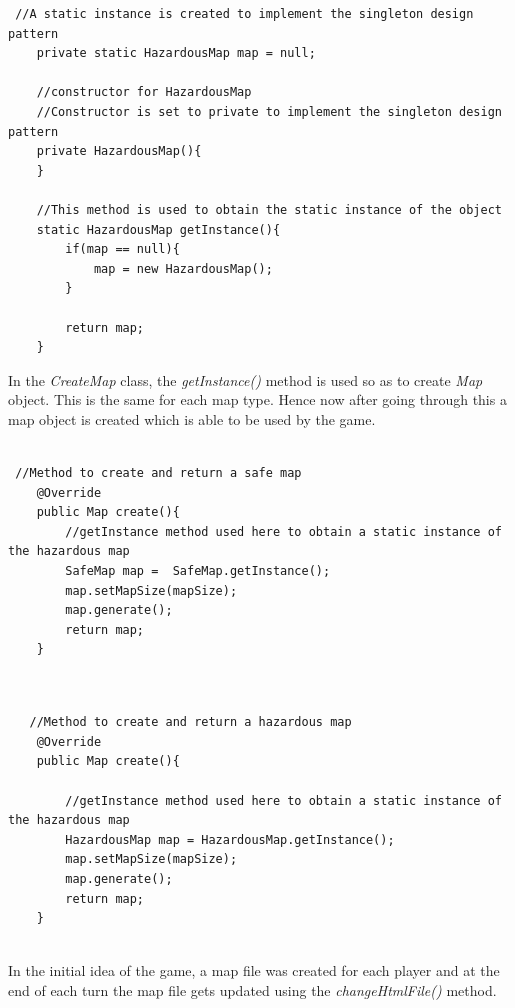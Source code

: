 \documentclass[a4paper,12pt]{extarticle}
\begin{document}
\begin{lstlisting}
 //A static instance is created to implement the singleton design pattern
    private static HazardousMap map = null;

    //constructor for HazardousMap
    //Constructor is set to private to implement the singleton design pattern
    private HazardousMap(){
    }

    //This method is used to obtain the static instance of the object
    static HazardousMap getInstance(){
        if(map == null){
            map = new HazardousMap();
        }

        return map;
    }

\end{lstlisting}
\vspace{4mm}

In the \textit{CreateMap} class, the \textit{getInstance()} method is used so as to create \textit{Map} object. This is the same for each map type. Hence now after going through this a map object is created which is able to be used by the game.\\

\begin{lstlisting}

 //Method to create and return a safe map
    @Override
    public Map create(){
        //getInstance method used here to obtain a static instance of the hazardous map
        SafeMap map =  SafeMap.getInstance();
        map.setMapSize(mapSize);
        map.generate();
        return map;
    }


\end{lstlisting}
\vspace{4mm}



\begin{lstlisting}

   //Method to create and return a hazardous map
    @Override
    public Map create(){

        //getInstance method used here to obtain a static instance of the hazardous map
        HazardousMap map = HazardousMap.getInstance();
        map.setMapSize(mapSize);
        map.generate();
        return map;
    }


\end{lstlisting}
\vspace{4mm}

In the initial idea of the game, a map file was created for each player and at the end of each turn the map file gets updated using the \textit{changeHtmlFile()} method.\\
\end{document}
